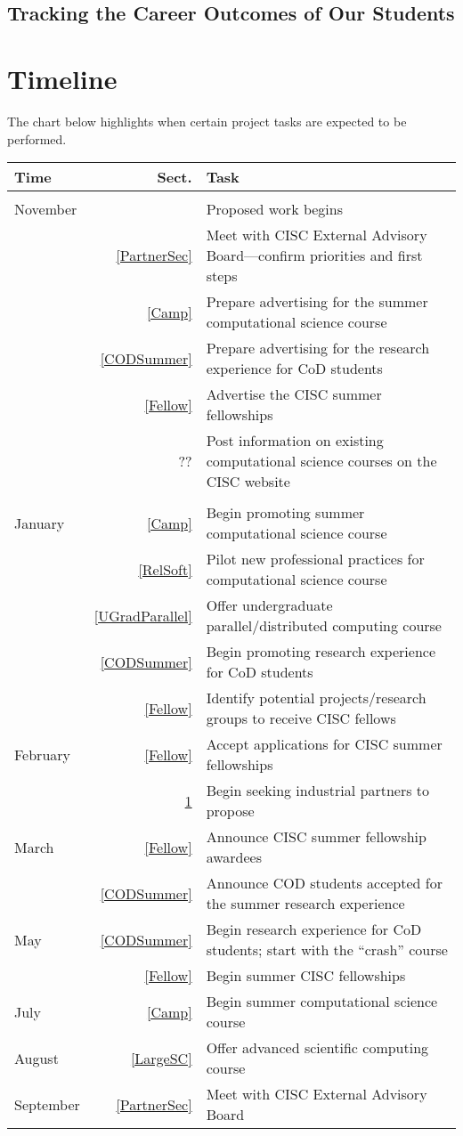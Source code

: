 \documentclass[11pt]{NSFamsart}
\begin{document}
\subsection{Tracking the Career Outcomes of Our Students} 


\section{Timeline}
The chart below highlights when certain project tasks are expected to be performed.

\bigskip

\begin{longtable}
{>{\raggedleft}p{}rp{}}
Time & Sect. & Task \tabularnewline
\toprule
2018 \tabularnewline
November & & Proposed work begins \tabularnewline
 & \ref{PartnerSec} & Meet with CISC External Advisory Board---confirm priorities and first steps \tabularnewline
& \ref{Camp} & Prepare advertising for the summer computational science course \tabularnewline
& \ref{CODSummer} & Prepare advertising for the research experience for CoD students \tabularnewline
& \ref{Fellow} & Advertise the CISC summer fellowships \tabularnewline
& ?? & Post information on existing computational science courses on the CISC website\tabularnewline
\midrule
2019 \tabularnewline
January & \ref{Camp} & Begin promoting summer computational science course \tabularnewline
& \ref{RelSoft} & Pilot new professional practices for computational science course  \tabularnewline
& \ref{UGradParallel} & Offer undergraduate parallel/distributed computing course \tabularnewline
& \ref{CODSummer} & Begin promoting research experience for CoD students \tabularnewline
& \ref{Fellow} & Identify potential projects/research groups to receive CISC fellows \tabularnewline
February & \ref{Fellow} & Accept applications for CISC summer fellowships \tabularnewline
& \ref{} & Begin seeking industrial partners to propose\tabularnewline
March & \ref{Fellow} & Announce CISC summer fellowship awardees \tabularnewline
& \ref{CODSummer} & Announce COD students accepted for the summer research experience \tabularnewline
May &  \ref{CODSummer} & Begin research experience for CoD students; start with the ``crash'' course \tabularnewline
& \ref{Fellow} & Begin summer CISC fellowships \tabularnewline
July &  \ref{Camp} & Begin summer computational science course \tabularnewline
August & \ref{LargeSC} & Offer advanced scientific computing course \tabularnewline
September
& \ref{PartnerSec} & Meet with CISC External Advisory Board \tabularnewline

\end{longtable}
\end{document}
